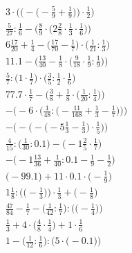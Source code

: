 \documentclass[8pt]{article}
\begin{document}
\begin{align}
3 \cdot \bigg(\Big(-\big(-\frac{5}{9} + \frac{1}{9}\big)\Big) \cdot \frac{1}{2}\bigg) \\
\frac{5}{27} : \frac{1}{6} - \Big(\frac{8}{9} \cdot \big(2\frac{2}{8} \cdot \frac{1}{3} \cdot \frac{1}{6}\big)\Big) \\
6\frac{17}{20} + \frac{1}{4} - \big(\frac{17}{70} - \frac{1}{7}\big) \cdot \big(\frac{1}{21} : \frac{1}{3}\big) \\
11.1 - \Big(\frac{13}{40} - \frac{1}{8} \cdot \big(\frac{9}{18} \cdot \frac{1}{9} : \frac{1}{9}\big)\Big) \\
\frac{5}{7} : \big(1 \cdot \frac{1}{7}\big) \cdot \big(\frac{3}{5} : \frac{1}{2} \cdot \frac{1}{6}\big) \\
77.7 \cdot \frac{1}{7} - \Big(\frac{3}{8} + \frac{1}{8} \cdot \big(\frac{1}{20} : \frac{1}{4}\big)\Big) \\
-\bigg(-6 \cdot \Big(\frac{1}{48} : \big(-\frac{11}{168} + \frac{1}{3} - \frac{1}{7}\big)\Big)\bigg) \\
-\bigg(-\Big(-\big(-5\frac{1}{3} - \frac{1}{3}\big) \cdot \frac{1}{5}\Big)\bigg) \\
\frac{4}{15} : \big(\frac{1}{30} : 0.1\big) - \big(-1\frac{2}{5} \cdot \frac{1}{7}\big) \\
-\big(-1\frac{13}{36} + \frac{1}{40} : 0.1 - \frac{1}{9} - \frac{1}{2}\big) \\
\big(-99.1\big) + 11 \cdot 0.1 \cdot \big(-\frac{1}{9}\big) \\
1\frac{1}{8} : \Big(\big(-\frac{1}{3}\big)\Big) \cdot \frac{1}{3} + \Big(-\frac{1}{8}\Big) \\
\frac{47}{84} - \frac{1}{7} - \Big(\frac{1}{42} : \frac{1}{7}\Big) : \Big(\big(-\frac{1}{4}\big)\Big) \\
\frac{1}{3} + 4 \cdot \big(\frac{4}{8} \cdot \frac{1}{4}\big) + 1 \cdot \frac{1}{6} \\
1 - \Big(\frac{1}{12} : \frac{1}{6}\Big) : \Big(5 \cdot \big(-0.1\big)\Big)
\end{align}
\end{document}

